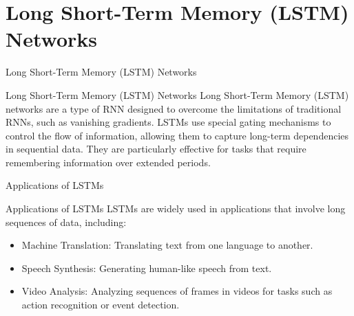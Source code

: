 \documentclass[hyperref={pdfpagelabels=false},aspectratio=169]{beamer}
\begin{document}
\section[LSTMs]{Long Short-Term Memory (LSTM) Networks}
\label{sec:org13904e4}
\begin{frame}[label={sec:orgeeebde5}]{Long Short-Term Memory (LSTM) Networks}
\begin{block}{Long Short-Term Memory (LSTM) Networks}
Long Short-Term Memory (LSTM) networks are a type of RNN designed to overcome the limitations of traditional RNNs, such as vanishing gradients. LSTMs use special gating mechanisms to control the flow of information, allowing them to capture long-term dependencies in sequential data. They are particularly effective for tasks that require remembering information over extended periods.
\end{block}
\end{frame}
\begin{frame}[label={sec:org7477c34}]{Applications of LSTMs}
\begin{block}{Applications of LSTMs}
LSTMs are widely used in applications that involve long sequences of data, including:
\begin{itemize}
\item \alert{Machine Translation}: Translating text from one language to another.
\item \alert{Speech Synthesis}: Generating human-like speech from text.
\item \alert{Video Analysis}: Analyzing sequences of frames in videos for tasks such as action recognition or event detection.
\end{itemize}
\end{block}
\end{frame}
\end{document}
